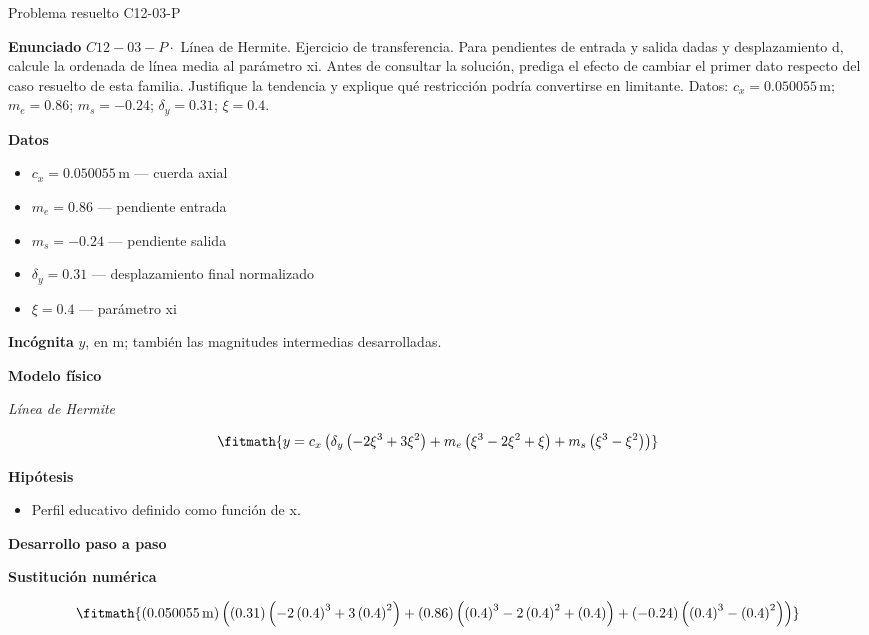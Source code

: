 \documentclass[10pt,openany]{book}
\begin{document}
\begin{studiumworked}{Problema resuelto C12-03-P}


\noindent\textbf{Enunciado}
\(C12-03-P \cdot\) Línea de Hermite. Ejercicio de transferencia. Para pendientes de entrada y salida dadas y desplazamiento d, calcule la ordenada de línea media al parámetro xi. Antes de consultar la solución, prediga el efecto de cambiar el primer dato respecto del caso resuelto de esta familia. Justifique la tendencia y explique qué restricción podría convertirse en limitante. Datos: \(c_x=0.050055\, \mathrm{m}\); \(m_e=0.86\); \(m_s=-0.24\); \(\delta_y=0.31\); \(\xi=0.4\).

\noindent\textbf{Datos}
\begin{itemize}
\item $c_x = 0.050055\,\mathrm{m}$ — cuerda axial
\item $m_e = 0.86$ — pendiente entrada
\item $m_s = -0.24$ — pendiente salida
\item $\delta_y = 0.31$ — desplazamiento final normalizado
\item $\xi = 0.4$ — parámetro xi
\end{itemize}

\noindent\textbf{Incógnita}
$y$, en $\mathrm{m}$; también las magnitudes intermedias desarrolladas.

\noindent\textbf{Modelo físico}

\noindent\textit{Línea de Hermite}

\[
\fitmath{y=c_x \left(\delta_y \left(- 2 \xi^{3} + 3 \xi^{2}\right) + m_e \left(\xi^{3} - 2 \xi^{2} + \xi\right) + m_s \left(\xi^{3} - \xi^{2}\right)\right)}
\]

\noindent\textbf{Hipótesis}
\begin{itemize}
\item Perfil educativo definido como función de x.
\end{itemize}

\noindent\textbf{Desarrollo paso a paso}



\noindent\textbf{Sustitución numérica}

\[
\fitmath{\left(0.050055\,\mathrm{m}\right) \left(\left(0.31\right) \left(- 2 \left(0.4\right)^{3} + 3 \left(0.4\right)^{2}\right) + \left(0.86\right) \left(\left(0.4\right)^{3} - 2 \left(0.4\right)^{2} + \left(0.4\right)\right) + \left(-0.24\right) \left(\left(0.4\right)^{3} - \left(0.4\right)^{2}\right)\right)}
\]


\end{studiumworked}
\end{document}
